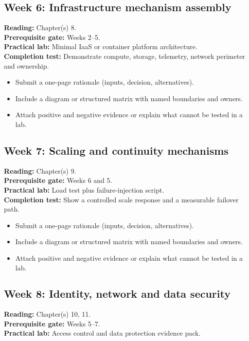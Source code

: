 \documentclass[10pt,letterpaper]{article}
\begin{document}
\subsection{Week 6: Infrastructure mechanism assembly}
\textbf{Reading:} Chapter(s) 8.\\
\textbf{Prerequisite gate:} Weeks 2--5.\\
\textbf{Practical lab:} Minimal IaaS or container platform architecture.\\
\textbf{Completion test:} Demonstrate compute, storage, telemetry, network perimeter and ownership.
\begin{itemize}
\item Submit a one-page rationale (inputs, decision, alternatives).
\item Include a diagram or structured matrix with named boundaries and owners.
\item Attach positive and negative evidence or explain what cannot be tested in a lab.
\end{itemize}
\subsection{Week 7: Scaling and continuity mechanisms}
\textbf{Reading:} Chapter(s) 9.\\
\textbf{Prerequisite gate:} Weeks 6 and 5.\\
\textbf{Practical lab:} Load test plus failure-injection script.\\
\textbf{Completion test:} Show a controlled scale response and a measurable failover path.
\begin{itemize}
\item Submit a one-page rationale (inputs, decision, alternatives).
\item Include a diagram or structured matrix with named boundaries and owners.
\item Attach positive and negative evidence or explain what cannot be tested in a lab.
\end{itemize}
\subsection{Week 8: Identity, network and data security}
\textbf{Reading:} Chapter(s) 10, 11.\\
\textbf{Prerequisite gate:} Weeks 5--7.\\
\textbf{Practical lab:} Access control and data protection evidence pack.\\
\end{document}
